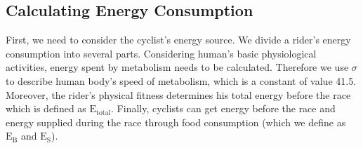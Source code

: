 \documentclass[14pt]{article}
\begin{document}
	\subsection{Calculating Energy Consumption}
	First, we need to consider the cyclist's energy source. We divide a rider's energy consumption into several parts. Considering human's basic physiological activities, energy spent by metabolism needs to be calculated. Therefore we use $\sigma$ to describe human body's speed of metabolism, which is a constant of value 41.5. Moreover, the rider's physical fitness determines his total energy before the race which is defined as $\mathrm{E}_\mathrm{total}$. Finally, cyclists can get energy before the race and energy supplied during the race through food consumption (which we define as $\mathrm{E}_\mathrm{B}$ and $\mathrm{E}_\mathrm{S}$). 
\end{document}
